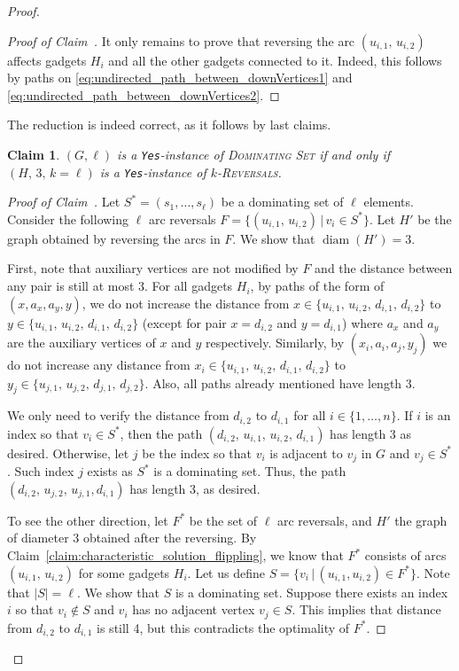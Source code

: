 \documentclass[11pt, twoside]{article}
\numberwithin{equation}{section}
\numberwithin{table}{section}
\numberwithin{figure}{section}
\newtheorem{Claim}[theorem]{Claim}
\theoremstyle{definition}
\theoremstyle{definition}
\theoremstyle{definition}
\newenvironment{claimproof}{%
  \begin{proof}[Proof of Claim~\theClaim]%
  \renewcommand{\qedsymbol}{$\lhd$}%
}{%
	\end{proof}%
}
\begin{document}
\begin{appendices}
\begin{proof}
\begin{claimproof}
    It only remains to prove that reversing the arc $(u_{i,1}, \, u_{i,2})$ affects gadgets $H_i$ and all the other gadgets connected to it. Indeed, this follows by paths on \cref{eq:undirected_path_between_downVertices1} and \cref{eq:undirected_path_between_downVertices2}.
\end{claimproof}

    The reduction is indeed correct, as it follows by last claims.
\begin{Claim}
\label{claim:correct_reduction}
   $(G,\ell)$ is a \texttt{Yes}-instance of \textsc{Dominating Set} if and only if $(H, \, 3, \, k =\ell)$ is a \texttt{Yes}-instance of \textsc{$k$-Reversals}.
\end{Claim}
\begin{claimproof}
    Let $S^* = (s_1, \dots, s_\ell)$ be a dominating set of $\ell$ elements. Consider the following $\ell$ arc reversals $F = \{ (u_{i,1}, \, u_{i,2}) \, \vert \, v_i \in S^* \}$. Let $H'$ be the graph obtained by reversing the arcs in $F$. We show that $\operatorname{diam} (H') = 3$. 

    First, note that auxiliary vertices are not modified by $F$ and the distance between any pair is still at most 3. 
    For all gadgets $H_i$, by paths of the form of $(x,a_x,a_y,y)$, we do not increase the distance from $x \in \{ u_{i,1}, \, u_{i,2}, \, d_{i,1}, \, d_{i,2} \}$ to  $y \in \{ u_{i,1}, \, u_{i,2}, \, d_{i,1}, \, d_{i,2} \}$ (except for pair $x =d_{i,2}$ and $y=d_{i,1}$)  where $a_x$ and $a_y$ are the auxiliary vertices of $x$ and $y$ respectively. 
    Similarly, by $(x_i, a_i, a_j, y_j)$ we do not increase any distance from $x_i \in \{ u_{i,1}, \, u_{i,2}, \, d_{i,1}, \, d_{i,2}\}$ to $y_j \in \{ u_{j,1}, \, u_{j,2}, \, d_{j,1}, \, d_{j,2}\}$. Also, all paths already mentioned have length 3.

    We only need to verify the distance from $d_{i,2}$ to $d_{i,1}$ for all $i \in \{ 1, \dots, n\}$. If $i$ is an index so that $v_i \in S^*$, then the path $(d_{i,2}, \, u_{i,1}, \, u_{i,2}, \, d_{i,1})$ has length 3 as desired. Otherwise, let $j$ be the index so that $v_i$ is adjacent to $v_j$ in $G$ and $v_j\in S^*$. Such index $j$ exists as $S^*$ is a dominating set. Thus, the path $(d_{i,2}, \, u_{j,2}, \, u_{j,1}, d_{i,1})$ has length 3, as desired. 

    To see the other direction, let $F^*$ be the set of $\ell$ arc reversals, and $H'$ the graph of diameter 3 obtained after the reversing. By Claim~\ref{claim:characteristic_solution_flippling}, we know that $F^*$ consists of arcs $(u_{i,1}, \, u_{i,2})$ for some gadgets $H_i$. Let us define $S = \{ v_i \,\vert \, (u_{i,1}, u_{i,2}) \in F^* \}$. Note that $|S| = \ell$. We show that $S$ is a dominating set. 
    Suppose there exists an index $i$ so that $v_i \notin S$ and $v_i$ has no adjacent vertex $v_j \in S$. This implies that distance from $d_{i,2}$ to $d_{i,1}$ is still 4, but this contradicts the optimality of $F^*$. 
\end{claimproof}           
\end{proof}


\end{appendices}
\end{document}
